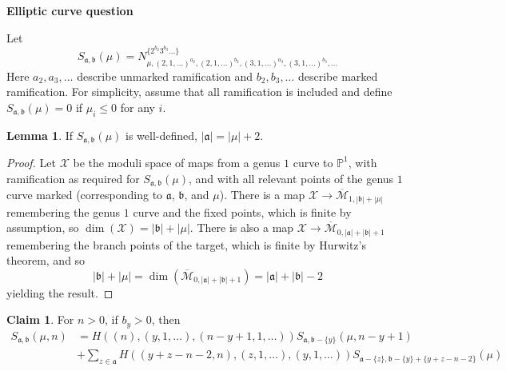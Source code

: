 \documentclass[11pt]{article}           %
\newcommand{\thishw}{\bf Elliptic curve question}
\theoremstyle{definition}
\newtheorem*{claim}{Claim}
\theoremstyle{definition}
\newtheorem*{lem}{Lemma}
\begin{document}
\centerline{\LARGE\thishw}


Let
\[
S_{\mathfrak a,\mathfrak b}(\mu)=N_{\mu,(2,1,\dots)^{a_2},(2,1,\dots)^{b_2},(3,1,\dots)^{a_3},(3,1,\dots)^{b_3},\dots}^{\{2^{b_2}3^{b_3}\dots\}}
\]
Here $a_2,a_3,\dots$ describe unmarked ramification and $b_2,b_3,\dots$ describe marked ramification. For
simplicity, assume that all ramification is included and define $S_{\mathfrak a,\mathfrak b}(\mu)= 0$ if $\mu_i\leq 0$ for any $i$.

\begin{lem}
  If $S_{\mathfrak a,\mathfrak b}(\mu)$ is well-defined, $|\mathfrak a|=|\mu|+2$.
\end{lem}
\begin{proof}
  Let $\mathcal X$ be the moduli space of maps from a genus $1$ curve to $\mathbb P^1$, with ramification as required for $S_{\mathfrak a,\mathfrak b}(\mu)$, and with all relevant points of the genus $1$ curve marked
  (corresponding to $\mathfrak a$, $\mathfrak b$, and $\mu$). There is a map $\mathcal X\to\overline{\mathcal M}_{1,|\mathfrak b|+|\mu|}$ remembering the genus $1$ curve and the fixed points, which is finite by assumption, so $\dim(\mathcal X)=|\mathfrak b|+|\mu|$. There is also a map $\mathcal X\to\overline{\mathcal M}_{0,|\mathfrak a|+|\mathfrak b|+1}$ remembering the branch points of the target, which is finite by Hurwitz's theorem, and so
  \[
  |\mathfrak b|+|\mu|=\dim(\overline{\mathcal M}_{0,|\mathfrak a|+|\mathfrak b|+1})=|\mathfrak a|+|\mathfrak b|-2
  \]
  yielding the result.
\end{proof}

\begin{claim}
  For $n>0$, if $b_y>0$, then
  \begin{align*}
    S_{\mathfrak a,\mathfrak b}(\mu, n) &=H((n),(y,1,\dots),(n-y+1,1,\dots))S_{\mathfrak a,\mathfrak b-\{y\}}(\mu, n-y+1) \\
    &+\sum_{z\in\mathfrak a}H((y+z-n-2,n),(z,1,\dots),(y,1,\dots))S_{\mathfrak a-\{z\},\mathfrak b-\{y\}+\{y+z-n-2\}}(\mu)
  \end{align*}
\end{claim}
\end{document}
